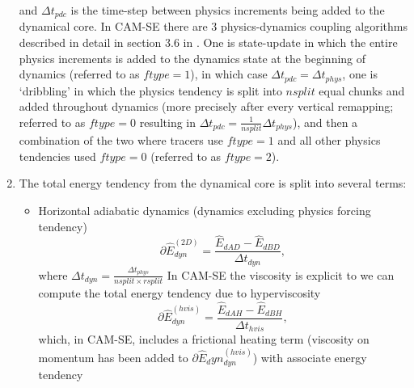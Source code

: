 \documentclass{agujournal}
\newcommand*{\gi}[1]{\widehat{#1}}
\begin{document}
\begin{enumerate}
\begin{equation}
\end{equation}
and $\Delta t_{pdc}$ is the time-step between physics increments being added to the dynamical core. In CAM-SE there are 3 physics-dynamics coupling algorithms described in detail in section 3.6 in \citet{LetAl2018JAMES}. One is state-update in which the entire physics increments is added to the dynamics state at the beginning of dynamics (referred to as $ftype=1$), in which case $\Delta t_{pdc}=\Delta t_{phys}$, one is `dribbling' in which the physics tendency is split into $nsplit$ equal chunks and added throughout dynamics (more precisely after every vertical remapping; referred to as $ftype=0$ resulting in $\Delta t_{pdc}=\frac{1}{nsplit}\Delta t_{phys}$), and then a combination of the two where tracers use  $ftype=1$ and all other physics tendencies used  $ftype=0$ (referred to as $ftype=2$). 
\item The total energy tendency from the dynamical core is split into several terms:
\begin{itemize} 
\item Horizontal adiabatic dynamics (dynamics excluding physics forcing tendency)
\begin{equation}
\partial \gi{E}_{dyn}^{({2D})}=\frac{\gi{E}_{dAD}-\gi{E}_{dBD}}{\Delta t_{dyn}},
\end{equation}
where $\Delta t_{dyn}=\frac{\Delta t_{phys}}{nsplit\times rsplit}$
In CAM-SE the viscosity is explicit to we can compute the total energy tendency due to hyperviscosity
\begin{equation}
\partial \gi{E}_{dyn}^{({hvis})}=\frac{\gi{E}_{dAH}-\gi{E}_{dBH}}{\Delta t_{hvis}},
\end{equation}
which, in CAM-SE, includes a frictional heating term (viscosity on momentum has been added to $\partial \gi{E}_dyn^{({hvis})}_{dyn}$) with associate energy tendency

\end{itemize}
\end{enumerate}
\end{document}
